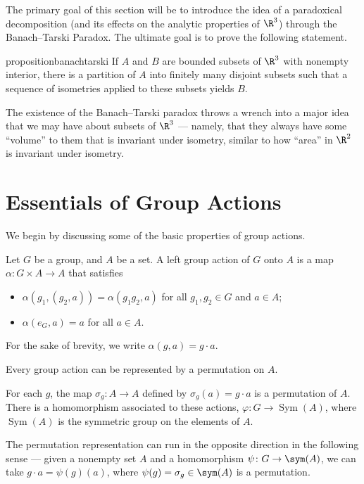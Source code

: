 The primary goal of this section will be to introduce the idea of a paradoxical decomposition (and its effects on the analytic properties of $\R^3$) through the Banach--Tarski Paradox. The ultimate goal is to prove the following statement.
\begin{restatable}{proposition}{banachtarski}
  If $A$ and $B$ are bounded subsets of $\R^3$ with nonempty interior, 
  there is a partition of $A$ into finitely many disjoint subsets 
  such that a sequence of isometries applied to these subsets yields $B$.
\label{prop:banachtarski}
\end{restatable}
The existence of the Banach--Tarski paradox throws a wrench into a major idea that we may have about subsets of $\R^3$ --- namely, that they always have some ``volume'' to them that is invariant under isometry, similar to how ``area'' in $\R^2$ is invariant under isometry.
\section{Essentials of Group Actions}
We begin by discussing some of the basic properties of group actions.
\begin{definition}
  Let $G$ be a group, and $A$ be a set. A left group action of $G$ onto $A$ is a map $\alpha\colon G\times A\rightarrow A$ that satisfies
  \begin{itemize}
    \item $\alpha\left(g_1,\left(g_2,a\right)\right) = \alpha\left(g_1g_2,a\right)$ for all $g_1,g_2\in G$ and $a\in A$;
    \item $\alpha\left(e_G,a\right) = a$ for all $a\in A$.
  \end{itemize}
  For the sake of brevity, we write $\alpha \left(g,a\right) = g\cdot a$.
\end{definition}
Every group action can be represented by a permutation on $A$.
\begin{definition}
  For each $g$, the map $\sigma_g\colon A\rightarrow A$ defined by $\sigma_g\left(a\right) = g\cdot a$ is a permutation of $A$. There is a homomorphism associated to these actions, $\varphi\colon G\rightarrow \operatorname{Sym}(A)$, where $\operatorname{Sym}(A)$ is the symmetric group on the elements of $A$.
\end{definition}
The permutation representation can run in the opposite direction in the following sense --- given a nonempty set $A$ and a homomorphism $\psi\colon G\rightarrow \sym(A)$, we can take $g\cdot a = \psi(g)(a)$, where $\psi(g) = \sigma_g\in \sym(A)$ is a permutation.\newline

